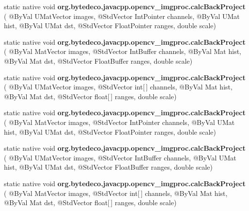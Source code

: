 \begin{DoxyCompactItemize}
static native void {\bfseries org.\+bytedeco.\+javacpp.\+opencv\+\_\+imgproc.\+calc\+Back\+Project} ( @By\+Val U\+Mat\+Vector images, @Std\+Vector Int\+Pointer channels, @By\+Val U\+Mat hist, @By\+Val U\+Mat dst, @Std\+Vector Float\+Pointer ranges, double scale)
\item 
\mbox{\label{group__imgproc__hist_ga95d97991465a814174f2e033354bc6c1}} 
static native void {\bfseries org.\+bytedeco.\+javacpp.\+opencv\+\_\+imgproc.\+calc\+Back\+Project} ( @By\+Val Mat\+Vector images, @Std\+Vector Int\+Buffer channels, @By\+Val Mat hist, @By\+Val Mat dst, @Std\+Vector Float\+Buffer ranges, double scale)
\item 
\mbox{\label{group__imgproc__hist_ga582ada5adffcf69f53a5bd54f13ffff7}} 
static native void {\bfseries org.\+bytedeco.\+javacpp.\+opencv\+\_\+imgproc.\+calc\+Back\+Project} ( @By\+Val U\+Mat\+Vector images, @Std\+Vector int\mbox{[}$\,$\mbox{]} channels, @By\+Val Mat hist, @By\+Val Mat dst, @Std\+Vector float\mbox{[}$\,$\mbox{]} ranges, double scale)
\item 
\mbox{\label{group__imgproc__hist_ga79c0d3878259f77173fd877022412b76}} 
static native void {\bfseries org.\+bytedeco.\+javacpp.\+opencv\+\_\+imgproc.\+calc\+Back\+Project} ( @By\+Val Mat\+Vector images, @Std\+Vector Int\+Pointer channels, @By\+Val U\+Mat hist, @By\+Val U\+Mat dst, @Std\+Vector Float\+Pointer ranges, double scale)
\item 
\mbox{\label{group__imgproc__hist_ga8b8738b645ea5b4924cee98bed5f2b27}} 
static native void {\bfseries org.\+bytedeco.\+javacpp.\+opencv\+\_\+imgproc.\+calc\+Back\+Project} ( @By\+Val U\+Mat\+Vector images, @Std\+Vector Int\+Buffer channels, @By\+Val U\+Mat hist, @By\+Val U\+Mat dst, @Std\+Vector Float\+Buffer ranges, double scale)
\item 
\mbox{\label{group__imgproc__hist_gadcd2c2ad51cb292f1f5ad06f66c8ad8f}} 
static native void {\bfseries org.\+bytedeco.\+javacpp.\+opencv\+\_\+imgproc.\+calc\+Back\+Project} ( @By\+Val Mat\+Vector images, @Std\+Vector int\mbox{[}$\,$\mbox{]} channels, @By\+Val Mat hist, @By\+Val Mat dst, @Std\+Vector float\mbox{[}$\,$\mbox{]} ranges, double scale)
\item 
\mbox{\label{group__imgproc__hist_ga96aac127318e1d1e1b25a00b8fa6c975}} 

\end{DoxyCompactItemize}
